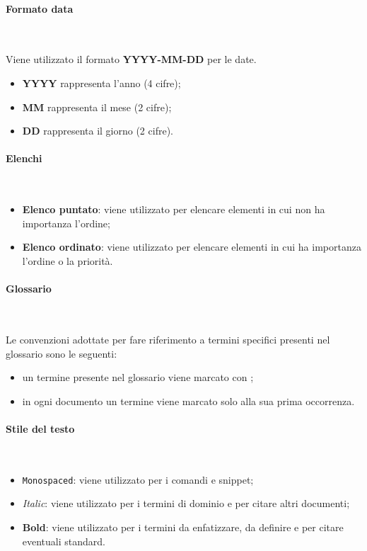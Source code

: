\paragraph{Formato data} ~

Viene utilizzato il formato \textbf{YYYY-MM-DD} per le date.
\begin{itemize}
    \item \textbf{YYYY} rappresenta l'anno (4 cifre);
    \item \textbf{MM} rappresenta il mese (2 cifre);
    \item \textbf{DD} rappresenta il giorno (2 cifre).
\end{itemize}

\paragraph{Elenchi} ~

\begin{itemize}
    \item \textbf{Elenco puntato}: viene utilizzato per elencare elementi in cui non ha importanza l'ordine;
    \item \textbf{Elenco ordinato}: viene utilizzato per elencare elementi in cui ha importanza l'ordine o la priorità.
\end{itemize}

\paragraph{Glossario} ~

Le convenzioni adottate per fare riferimento a termini specifici presenti nel glossario sono le seguenti:
\begin{itemize}
    \item un termine presente nel glossario viene marcato con \glo;
    \item in ogni documento un termine viene marcato solo alla sua prima occorrenza.
\end{itemize}

\paragraph{Stile del testo} ~

\begin{itemize}
    \item \texttt{Monospaced}: viene utilizzato per i comandi e snippet;
    \item \textit{Italic}: viene utilizzato per i termini di dominio e per citare altri documenti;
    \item \textbf{Bold}: viene utilizzato per i termini da enfatizzare, da definire e per citare eventuali standard.
\end{itemize}

